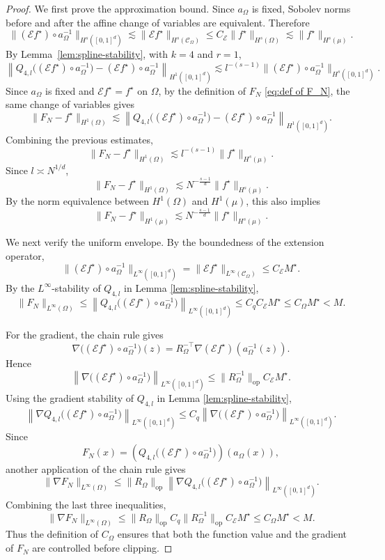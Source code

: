 \documentclass[11pt]{article}
\theoremstyle{plain}
\theoremstyle{definition}
\theoremstyle{remark}
\begin{document}
\begin{proof}
We first prove the approximation bound. Since \(a_\Omega\) is fixed, Sobolev
norms before and after the affine change of variables are equivalent.
Therefore
\[
\|(\mathcal E f^\star)\circ a_\Omega^{-1}\|_{H^s([0,1]^d)}
\lesssim
\|\mathcal E f^\star\|_{H^s(\mathcal C_\Omega)}
\le
C_{\mathcal E}\|f^\star\|_{H^s(\Omega)}
\lesssim
\|f^\star\|_{H^s(\mu)}.
\]
By Lemma~\ref{lem:spline-stability}, with \(k=4\) and \(r=1\),
\[
\left\|
Q_{4,l}\bigl((\mathcal E f^\star)\circ a_\Omega^{-1}\bigr)
-
(\mathcal E f^\star)\circ a_\Omega^{-1}
\right\|_{H^1([0,1]^d)}
\lesssim
l^{-(s-1)}
\|(\mathcal E f^\star)\circ a_\Omega^{-1}\|_{H^s([0,1]^d)}.
\]
Since \(a_\Omega\) is fixed and \(\mathcal E f^\star=f^\star\) on
\(\Omega\), by the definition of $F_N$ \eqref{eq:def of F_N}, the same change of variables gives
\[
\|F_N-f^\star\|_{H^1(\Omega)}
\lesssim
\left\|
Q_{4,l}\bigl((\mathcal E f^\star)\circ a_\Omega^{-1}\bigr)
-
(\mathcal E f^\star)\circ a_\Omega^{-1}
\right\|_{H^1([0,1]^d)}.
\]
Combining the previous estimates,
\[
\|F_N-f^\star\|_{H^1(\Omega)}
\lesssim
l^{-(s-1)}
\|f^\star\|_{H^s(\mu)}.
\]
Since \(l\asymp N^{1/d}\),
\[
\|F_N-f^\star\|_{H^1(\Omega)}
\lesssim
N^{-\frac{s-1}{d}}
\|f^\star\|_{H^s(\mu)}.
\]
By the norm equivalence between \(H^1(\Omega)\) and \(H^1(\mu)\), this
also implies
\[
\|F_N-f^\star\|_{H^1(\mu)}
\lesssim
N^{-\frac{s-1}{d}}
\|f^\star\|_{H^s(\mu)}.
\]

We next verify the uniform envelope. By the boundedness of the extension
operator,
\[
\|(\mathcal E f^\star)\circ a_\Omega^{-1}\|_{L^\infty([0,1]^d)}
=
\|\mathcal E f^\star\|_{L^\infty(\mathcal C_\Omega)}
\le
C_{\mathcal E}M^\star .
\]
By the \(L^\infty\)-stability of \(Q_{4,l}\) in Lemma \ref{lem:spline-stability},
\[
\|F_N\|_{L^\infty(\Omega)}
\le
\left\|
Q_{4,l}\bigl((\mathcal E f^\star)\circ a_\Omega^{-1}\bigr)
\right\|_{L^\infty([0,1]^d)}
\le
C_qC_{\mathcal E}M^\star
\le
C_\Omega M^\star
<
M.
\]

For the gradient, the chain rule gives
\[
\nabla\bigl((\mathcal E f^\star)\circ a_\Omega^{-1}\bigr)(z)
=
R_\Omega^{-\top}
\nabla(\mathcal E f^\star)(a_\Omega^{-1}(z)).
\]
Hence
\[
\left\|
\nabla\bigl((\mathcal E f^\star)\circ a_\Omega^{-1}\bigr)
\right\|_{L^\infty([0,1]^d)}
\le
\|R_\Omega^{-1}\|_{\mathrm{op}}C_{\mathcal E}M^\star .
\]
Using the gradient stability of \(Q_{4,l}\) in Lemma \ref{lem:spline-stability},
\[
\left\|
\nabla Q_{4,l}\bigl((\mathcal E f^\star)\circ a_\Omega^{-1}\bigr)
\right\|_{L^\infty([0,1]^d)}
\le
C_q
\left\|
\nabla\bigl((\mathcal E f^\star)\circ a_\Omega^{-1}\bigr)
\right\|_{L^\infty([0,1]^d)}.
\]
Since
\[
F_N(x)
=
\left(
Q_{4,l}\bigl((\mathcal E f^\star)\circ a_\Omega^{-1}\bigr)
\right)(a_\Omega(x)),
\]
another application of the chain rule gives
\[
\|\nabla F_N\|_{L^\infty(\Omega)}
\le
\|R_\Omega\|_{\mathrm{op}}
\left\|
\nabla Q_{4,l}\bigl((\mathcal E f^\star)\circ a_\Omega^{-1}\bigr)
\right\|_{L^\infty([0,1]^d)}.
\]
Combining the last three inequalities,
\[
\|\nabla F_N\|_{L^\infty(\Omega)}
\le
\|R_\Omega\|_{\mathrm{op}}
C_q
\|R_\Omega^{-1}\|_{\mathrm{op}}
C_{\mathcal E}M^\star
\le
C_\Omega M^\star
<
M.
\]
Thus the definition of \(C_\Omega\) ensures that both the function value and
the gradient of \(F_N\) are controlled before clipping.


\end{proof}
\end{document}
